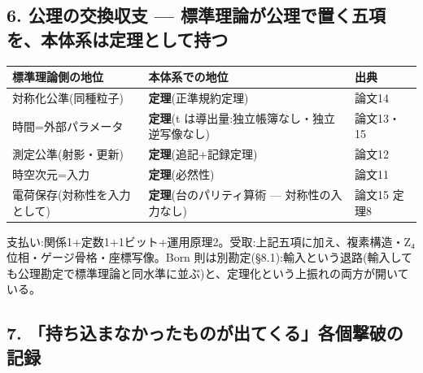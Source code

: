 \documentclass[
]{ltjsarticle}
\newcounter{none} %
\begin{document}
\subsection{6. 公理の交換収支 ---
標準理論が公理で置く五項を、本体系は定理として持つ}\label{ux516cux7406ux306eux4ea4ux63dbux53ceux652f-ux6a19ux6e96ux7406ux8ad6ux304cux516cux7406ux3067ux7f6eux304fux4e94ux9805ux3092ux672cux4f53ux7cfbux306fux5b9aux7406ux3068ux3057ux3066ux6301ux3064}

{\def\LTcaptype{none} %
\begin{longtable}[]{@{}
  >{\raggedright\arraybackslash}p{}
  >{\raggedright\arraybackslash}p{}
  >{\raggedright\arraybackslash}p{}@{}}
\toprule\noalign{}
\begin{minipage}[b]{\linewidth}\raggedright
標準理論側の地位
\end{minipage} & \begin{minipage}[b]{\linewidth}\raggedright
本体系での地位
\end{minipage} & \begin{minipage}[b]{\linewidth}\raggedright
出典
\end{minipage} \\
\midrule\noalign{}
\endhead
\bottomrule\noalign{}
\endlastfoot
対称化公準(同種粒子) & \textbf{定理}(正準規約定理) & 論文14 \\
時間=外部パラメータ & \textbf{定理}(t
は導出量:独立帳簿なし・独立逆写像なし) & 論文13・15 \\
測定公準(射影・更新) & \textbf{定理}(追記+記録定理) & 論文12 \\
時空次元=入力 & \textbf{定理}(必然性) & 論文11 \\
電荷保存(対称性を入力として) & \textbf{定理}(台のパリティ算術 ---
対称性の入力なし) & 論文15 定理8 \\
\end{longtable}
}

支払い:関係1+定数1+1ビット+運用原理2。受取:上記五項に加え、複素構造・Z₄
位相・ゲージ骨格・座標写像。Born
則は別勘定(§8.1):輸入という退路(輸入しても公理勘定で標準理論と同水準に並ぶ)と、定理化という上振れの両方が開いている。

\subsection{7.
「持ち込まなかったものが出てくる」各個撃破の記録}\label{ux6301ux3061ux8fbcux307eux306aux304bux3063ux305fux3082ux306eux304cux51faux3066ux304fux308bux5404ux500bux6483ux7834ux306eux8a18ux9332}
\end{document}
